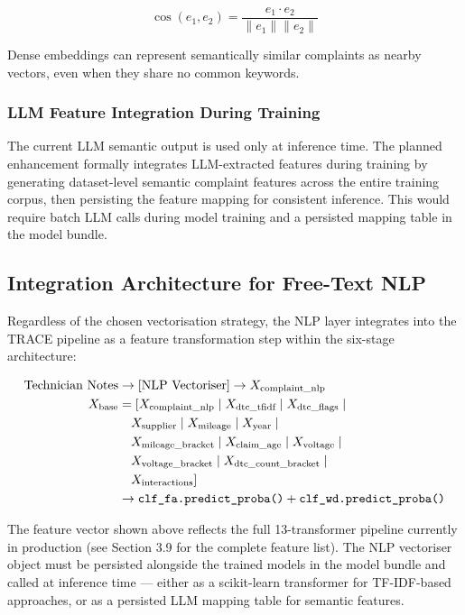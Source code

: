 \documentclass[10pt]{article}
\begin{document}
\begin{equation}
\cos(e_1, e_2) = \frac{e_1 \cdot e_2}{\|e_1\| \|e_2\|}
\end{equation}

Dense embeddings can represent semantically similar complaints as nearby vectors, even when they share no common keywords.

\subsubsection{LLM Feature Integration During Training}

The current LLM semantic output is used only at inference time. The planned enhancement formally integrates LLM-extracted features during training by generating dataset-level semantic complaint features across the entire training corpus, then persisting the feature mapping for consistent inference. This would require batch LLM calls during model training and a persisted mapping table in the model bundle.

\subsection{Integration Architecture for Free-Text NLP}

Regardless of the chosen vectorisation strategy, the NLP layer integrates into the TRACE pipeline as a feature transformation step within the six-stage architecture:

\begin{align}
\text{Technician Notes} &\rightarrow [\text{NLP Vectoriser}] \rightarrow X_{\text{complaint\_nlp}} \\
X_{\text{base}} &= [X_{\text{complaint\_nlp}} \mid X_{\text{dtc\_tfidf}} \mid X_{\text{dtc\_flags}} \mid {} \notag \\
&\quad X_{\text{supplier}} \mid X_{\text{mileage}} \mid X_{\text{year}} \mid {} \notag \\
&\quad X_{\text{mileage\_bracket}} \mid X_{\text{claim\_age}} \mid X_{\text{voltage}} \mid {} \notag \\
&\quad X_{\text{voltage\_bracket}} \mid X_{\text{dtc\_count\_bracket}} \mid {} \notag \\
&\quad X_{\text{interactions}}] \\
&\rightarrow \texttt{clf\_fa.predict\_proba()} + \texttt{clf\_wd.predict\_proba()}
\end{align}

The feature vector shown above reflects the full 13-transformer pipeline currently in production (see Section 3.9 for the complete feature list). The NLP vectoriser object must be persisted alongside the trained models in the model bundle and called at inference time --- either as a scikit-learn transformer for TF-IDF-based approaches, or as a persisted LLM mapping table for semantic features.
\end{document}
